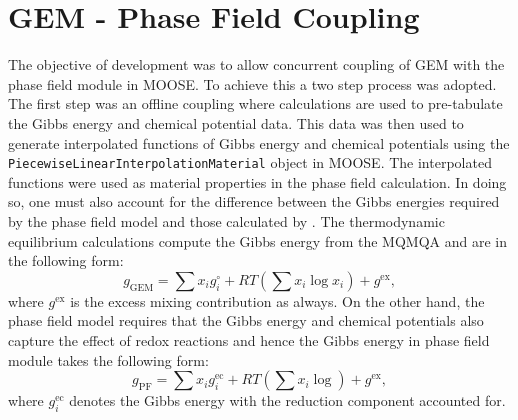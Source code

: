 \section{GEM - Phase Field Coupling}\label{sec:gem_pf}
The objective of {\YJ} development was to allow concurrent coupling of GEM with the phase field module in MOOSE. To achieve this a two step process was adopted. The first step was an offline coupling where {\GEM} calculations are used to pre-tabulate the Gibbs energy and chemical potential data. This data was then used to generate interpolated functions of Gibbs energy and chemical potentials using the \texttt{PiecewiseLinearInterpolationMaterial} object in MOOSE. The interpolated functions were used as material properties in the phase field calculation. In doing so, one must also account for the difference between the Gibbs energies required by the phase field model and those calculated by {\GEM}. The thermodynamic equilibrium calculations compute the Gibbs energy from the MQMQA and are in the following form:
\begin{equation}
	g_\text{GEM} = \sum x_i g_i^\circ + RT\left( \sum x_i \log{x_i} \right) + g^\text{ex},
\end{equation}
where $g^\text{ex}$ is the excess mixing contribution as always. On the other hand, the phase field model requires that the Gibbs energy and chemical potentials also capture the effect of redox reactions and hence the Gibbs energy in phase field module takes the following form:
\begin{equation}
	g_\text{PF} = \sum x_i g_i^\text{ec}  + RT\left( \sum x_i \log{} \right) + g^\text{ex},
\end{equation}
where $g_i^\text{ec}$ denotes the Gibbs energy with the reduction component accounted for. 

